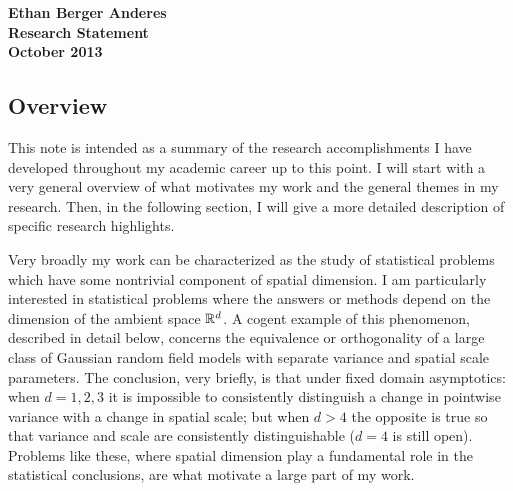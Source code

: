 \documentclass[12pt]{article}
\begin{document}
\begin{center} {\large \bf Ethan Berger Anderes}  \vspace{.2cm}\\ \bf Research Statement \\ {\small October 2013}\end{center}

\subsection*{Overview}

This note is intended as a summary of the research accomplishments I have developed throughout  my academic career up to this point. I will start with a very general overview of what motivates my work and the general themes in my research. Then, in the following section, I will give a more detailed description of  specific research highlights.


Very broadly my work can be characterized as the study of statistical problems which have some nontrivial  component of spatial dimension.
I am particularly interested in statistical problems where the answers or methods depend on the dimension of the ambient space $\Bbb R^d$.
A cogent example of this phenomenon, described in detail below, concerns the equivalence or orthogonality of a large class of Gaussian random field models with separate variance and spatial scale parameters. The conclusion, very briefly,
is that under fixed domain asymptotics: when  $d=1,2,3$
 it is impossible to consistently distinguish a change in pointwise variance with  a change in spatial scale; but when $d>4$ the opposite is true so that variance and scale are consistently distinguishable ($d=4$ is still open).
Problems like these, where spatial dimension play a fundamental role in the statistical conclusions, are what  motivate a large part of my work.
\end{document}
